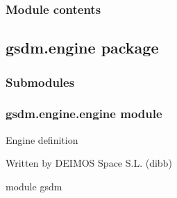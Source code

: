 \subsubsection{Module contents}
\label{\detokenize{gsdm.datamodel:module-gsdm.datamodel}}\label{\detokenize{gsdm.datamodel:module-contents}}

\subsection{gsdm.engine package}
\label{\detokenize{gsdm.engine:gsdm-engine-package}}\label{\detokenize{gsdm.engine::doc}}

\subsubsection{Submodules}
\label{\detokenize{gsdm.engine:submodules}}

\subsubsection{gsdm.engine.engine module}
\label{\detokenize{gsdm.engine:module-gsdm.engine.engine}}\label{\detokenize{gsdm.engine:gsdm-engine-engine-module}}
Engine definition

Written by DEIMOS Space S.L. (dibb)

module gsdm

